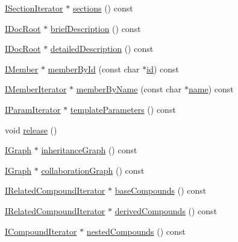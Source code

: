 \begin{DoxyCompactItemize}
\item 
\hyperlink{class_i_section_iterator}{I\+Section\+Iterator} $\ast$ \hyperlink{class_compound_handler_a61056e88442b4df236d0ebfb2c132be6}{sections} () const 
\item 
\hyperlink{class_i_doc_root}{I\+Doc\+Root} $\ast$ \hyperlink{class_compound_handler_adb7f26a185347c8b004aaec1f4ebcc92}{brief\+Description} () const 
\item 
\hyperlink{class_i_doc_root}{I\+Doc\+Root} $\ast$ \hyperlink{class_compound_handler_aa1d733f5008029b3c8a13f513132cef6}{detailed\+Description} () const 
\item 
\hyperlink{class_i_member}{I\+Member} $\ast$ \hyperlink{class_compound_handler_a17237274dafc014dca4f6a41a1f6c45c}{member\+By\+Id} (const char $\ast$\hyperlink{class_compound_handler_ae032b7d586f91004a51e315d7d40b482}{id}) const 
\item 
\hyperlink{class_i_member_iterator}{I\+Member\+Iterator} $\ast$ \hyperlink{class_compound_handler_a87169410ca8fa173a2c7a4ab942a4096}{member\+By\+Name} (const char $\ast$\hyperlink{class_compound_handler_a3e64bb10353a10cbd873ea98a9471f98}{name}) const 
\item 
\hyperlink{class_i_param_iterator}{I\+Param\+Iterator} $\ast$ \hyperlink{class_compound_handler_a77aae902803e8e3dd8c0b513e0e067aa}{template\+Parameters} () const 
\item 
void \hyperlink{class_compound_handler_a29f352627cbc021762c72835dfb63778}{release} ()
\item 
\hyperlink{class_i_graph}{I\+Graph} $\ast$ \hyperlink{class_compound_handler_ae7c0aa9c75eceab869a76272bcd98590}{inheritance\+Graph} () const 
\item 
\hyperlink{class_i_graph}{I\+Graph} $\ast$ \hyperlink{class_compound_handler_abba566f018d8b5c0cf4c957ad55f41f6}{collaboration\+Graph} () const 
\item 
\hyperlink{class_i_related_compound_iterator}{I\+Related\+Compound\+Iterator} $\ast$ \hyperlink{class_compound_handler_ac999b8fc53e4a9f55103acf680201ccf}{base\+Compounds} () const 
\item 
\hyperlink{class_i_related_compound_iterator}{I\+Related\+Compound\+Iterator} $\ast$ \hyperlink{class_compound_handler_a60c5bf8d411b1569d9f2c35e2309ce61}{derived\+Compounds} () const 
\item 
\hyperlink{class_i_compound_iterator}{I\+Compound\+Iterator} $\ast$ \hyperlink{class_compound_handler_a136a73ca200bfedee6fa0a547842a204}{nested\+Compounds} () const 
\item 

\end{DoxyCompactItemize}
